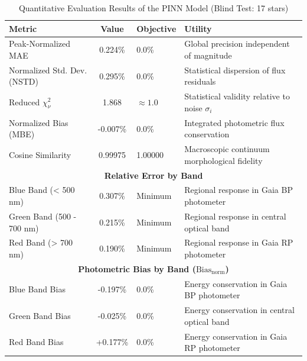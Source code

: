 
\begin{table}[htpb]
\centering
\caption{Quantitative Evaluation Results of the PINN Model (Blind Test: 17 stars)}
\label{tab:pinn_evaluation}
\begin{tabular}{lcll}
\hline
\textbf{Metric} & \textbf{Value} & \textbf{Objective} & \textbf{Utility} \\
\hline
Peak-Normalized MAE & 0.224\% & 0.0\% & Global precision independent of magnitude \\
Normalized Std. Dev. (NSTD) & 0.295\% & 0.0\% & Statistical dispersion of flux residuals \\
Reduced $\chi^2_\nu$ & 1.868 & $\approx 1.0$ & Statistical validity relative to noise $\sigma_i$ \\
Normalized Bias (MBE) & -0.007\% & 0.0\% & Integrated photometric flux conservation \\
Cosine Similarity & 0.99975 & 1.00000 & Macroscopic continuum morphological fidelity \\
\hline
\multicolumn{4}{c}{\textbf{Relative Error by Band}} \\
\hline
Blue Band (< 500 nm) & 0.307\% & Minimum & Regional response in Gaia BP photometer \\
Green Band (500 - 700 nm) & 0.215\% & Minimum & Regional response in central optical band \\
Red Band (> 700 nm) & 0.190\% & Minimum & Regional response in Gaia RP photometer \\
\hline
\multicolumn{4}{c}{\textbf{Photometric Bias by Band ($\text{Bias}_{\text{norm}}$)}} \\
\hline
Blue Band Bias & -0.197\% & 0.0\% & Energy conservation in Gaia BP photometer \\
Green Band Bias & -0.025\% & 0.0\% & Energy conservation in central optical band \\
Red Band Bias & +0.177\% & 0.0\% & Energy conservation in Gaia RP photometer \\
\hline
\end{tabular}
\end{table}
